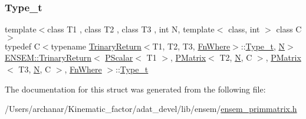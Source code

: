\subsubsection{\texorpdfstring{Type\_t}{Type\_t}\hspace{0.1cm}{\footnotesize\ttfamily [2/2]}}
{\footnotesize\ttfamily template$<$class T1 , class T2 , class T3 , int N, template$<$ class, int $>$ class C$>$ \\
typedef C$<$typename \mbox{\hyperlink{structENSEM_1_1TrinaryReturn}{Trinary\+Return}}$<$T1, T2, T3, \mbox{\hyperlink{structENSEM_1_1FnWhere}{Fn\+Where}}$>$\+::\mbox{\hyperlink{structENSEM_1_1TrinaryReturn_3_01PScalar_3_01T1_01_4_00_01PMatrix_3_01T2_00_01N_00_01C_01_4_00_0f44c172914945b9c1c722e99398bb914_a2f25acb4d9c917c29e862e4843292451}{Type\+\_\+t}}, \mbox{\hyperlink{operator__name__util_8cc_a7722c8ecbb62d99aee7ce68b1752f337}{N}}$>$ \mbox{\hyperlink{structENSEM_1_1TrinaryReturn}{E\+N\+S\+E\+M\+::\+Trinary\+Return}}$<$ \mbox{\hyperlink{classENSEM_1_1PScalar}{P\+Scalar}}$<$ T1 $>$, \mbox{\hyperlink{classENSEM_1_1PMatrix}{P\+Matrix}}$<$ T2, \mbox{\hyperlink{operator__name__util_8cc_a7722c8ecbb62d99aee7ce68b1752f337}{N}}, C $>$, \mbox{\hyperlink{classENSEM_1_1PMatrix}{P\+Matrix}}$<$ T3, \mbox{\hyperlink{operator__name__util_8cc_a7722c8ecbb62d99aee7ce68b1752f337}{N}}, C $>$, \mbox{\hyperlink{structENSEM_1_1FnWhere}{Fn\+Where}} $>$\+::\mbox{\hyperlink{structENSEM_1_1TrinaryReturn_3_01PScalar_3_01T1_01_4_00_01PMatrix_3_01T2_00_01N_00_01C_01_4_00_0f44c172914945b9c1c722e99398bb914_a2f25acb4d9c917c29e862e4843292451}{Type\+\_\+t}}}



The documentation for this struct was generated from the following file\+:\begin{DoxyCompactItemize}
\item 
/\+Users/archanar/\+Kinematic\+\_\+factor/adat\+\_\+devel/lib/ensem/\mbox{\hyperlink{lib_2ensem_2ensem__primmatrix_8h}{ensem\+\_\+primmatrix.\+h}}\end{DoxyCompactItemize}

